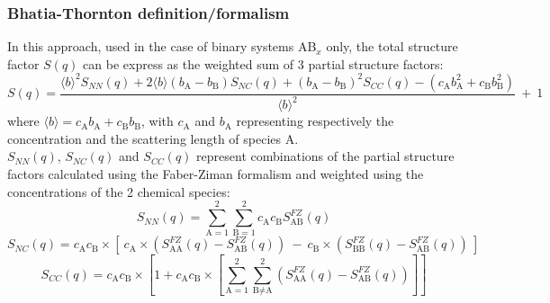\subsubsection{Bhatia-Thornton definition/formalism}
In this approach, used in the case of binary systems AB$_x$ \cite{PhysRevB.2.3004} only, the total structure factor $S(q)$ can be express as the weighted sum of 3 partial structure factors:
\begin{equation}
\label{sqp4}
S(q)= \frac{\langle b \rangle^2 S_{NN}(q) + 2\langle b \rangle(b_\text{A} -b_\text{B})S_{NC}(q) + (b_\text{A}-b_\text{B})^2S_{CC}(q) - (c_\text{A} b_\text{A}^2 + c_\text{B} b_\text{B}^2)}{\langle b \rangle^2}\ +\ 1
\end{equation}
where $\langle b \rangle = c_\text{A} b_\text{A} + c_\text{B} b_\text{B}$, with $c_\text{A}$ and $b_\text{A}$ representing respectively the concentration and the scattering length of species $\text{A}$. \\
$S_{NN}(q)$, $S_{NC}(q)$ and $S_{CC}(q)$ represent combinations of the partial structure factors calculated using the Faber-Ziman formalism and weighted using the concentrations of the 2 chemical species:
\begin{equation}
\label{sqp5}
S_{NN}(q) = \sum_{\text{A}=1}^{2} \sum_{\text{B}=1}^{2} c_{\text{A}} c_{\text{B}} S^{FZ}_{\text{A} \text{B}}(q)
\end{equation}
\begin{equation}
\label{sqp6}
 S_{NC}(q) = c_{\text{A}} c_{\text{B}} \times \left[\ c_\text{A}\times\left(S^{FZ}_{\text{A}\text{A}}(q) - S^{FZ}_{\text{A} \text{B}}(q)\right)\ -\ c_{\text{B}}\times\left(S^{FZ}_{\text{B}\text{B}}(q) - S^{FZ}_{\text{A} \text{B}}(q)\right)\ \right]
\end{equation}
\begin{equation}
\label{sqp7}
S_{CC}(q) = c_{\text{A}} c_{\text{B}} \times \left[ 1 + c_{\text{A}} c_{\text{B}} \times \left[ \sum_{\text{A}=1}^{2} \sum_{\text{B}\ne\text{A}}^{2} \left( S^{FZ}_{\text{A}\text{A}}(q) - S^{FZ}_{\text{A}\text{B}}(q) \right)\right] \right]
\end{equation}
\vspace{0.01cm}
